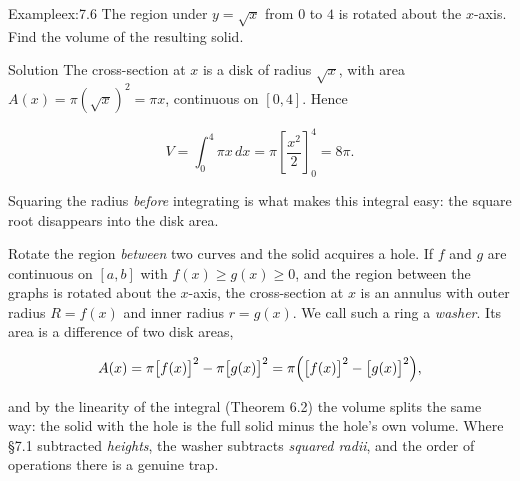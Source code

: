 \documentclass[a4paper,12pt,oneside]{memoir}
\begin{document}
\begin{workedexample}
\begin{envexample}{Example}{ex:7.6}{}
The region under \(y = \sqrt{x}\) from \(0\) to \(4\) is rotated about the \(x\)-axis. Find the volume of the resulting solid.
\end{envexample}
\begin{envsolution}{Solution}{}{}
The cross-section at \(x\) is a disk of radius \(\sqrt{x}\), with area \(A(x) = \pi (\sqrt{x})^{2} = \pi x\), continuous on \([0, 4]\). Hence

\[ V = \int_{0}^{4} \pi x\,dx = \pi \left[\frac{x^{2}}{2}\right]_{0}^{4} = 8\pi. \]

Squaring the radius \emph{before} integrating is what makes this integral easy: the square root disappears into the disk area. \qedmark
\end{envsolution}
\end{workedexample}
Rotate the region \emph{between} two curves and the solid acquires a hole. If \(f\) and \(g\) are continuous on \([a, b]\) with \(f(x) \ge g(x) \ge 0\), and the region between the graphs is rotated about the \(x\)-axis, the cross-section at \(x\) is an annulus with outer radius \(R = f(x)\) and inner radius \(r = g(x)\). We call such a ring a \emph{washer}. Its area is a difference of two disk areas,

\[ A(x) = \pi \bigl[f(x)\bigr]^{2} - \pi \bigl[g(x)\bigr]^{2} = \pi \Bigl(\bigl[f(x)\bigr]^{2} - \bigl[g(x)\bigr]^{2}\Bigr), \]

and by the linearity of the integral (Theorem 6.2) the volume splits the same way: the solid with the hole is the full solid minus the hole’s own volume. Where §7.1 subtracted \emph{heights}, the washer subtracts \emph{squared radii}, and the order of operations there is a genuine trap.
\end{document}
